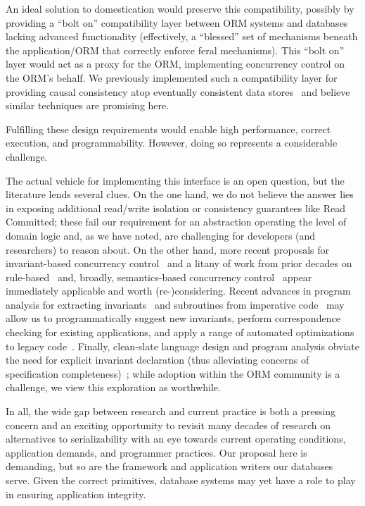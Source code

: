 \begin{enumerate}
  An ideal solution to domestication would preserve this
  compatibility, possibly by providing a ``bolt on'' compatibility
  layer between ORM systems and databases lacking advanced
  functionality (effectively, a ``blessed'' set of mechanisms beneath
  the application/ORM that correctly enforce feral mechanisms). This
  ``bolt on'' layer would act as a proxy for the ORM, implementing
  concurrency control on the ORM's behalf. We previously implemented
  such a compatibility layer for providing causal consistency atop
  eventually consistent data stores~\cite{bolton} and believe similar
  techniques are promising here.

\end{enumerate}
Fulfilling these design requirements would enable high performance,
correct execution, and programmability. However, doing so represents a
considerable challenge.

 The actual vehicle for
implementing this interface is an open question, but the literature
lends several clues. On the one hand, we do not believe the answer
lies in exposing additional read/write isolation or consistency
guarantees like Read Committed; these fail our requirement for an
abstraction operating the level of domain logic and, as we have noted,
are challenging for developers (and researchers) to reason about. On
the other hand, more recent proposals for invariant-based concurrency
control~\cite{redblue-new,coord-avoid} and a litany of work from prior
decades on rule-based~\cite{activedb-book} and, broadly,
semantics-based concurrency control~\cite{tamer-book} appear
immediately applicable and worth (re-)considering. Recent advances in
program analysis for extracting invariants~\cite{homeostasis} and
subroutines from imperative code~\cite{statusquo} may allow us to
programmatically suggest new invariants, perform correspondence
checking for existing applications, and apply a range of automated
optimizations to legacy code~\cite{pyxis,waves}. Finally, clean-slate
language design and program analysis obviate the need for explicit
invariant declaration (thus alleviating concerns of specification
completeness)~\cite{calm,blazes,hilda}; while adoption within the ORM
community is a challenge, we view this exploration as worthwhile.

 In all, the wide gap between research and current practice is both a
pressing concern and an exciting opportunity to revisit many decades
of research on alternatives to serializability with an eye towards
current operating conditions, application demands, and programmer
practices. Our proposal here is demanding, but so are the framework
and application writers our databases serve. Given the correct
primitives, database systems may yet have a role to play in ensuring
application integrity.

